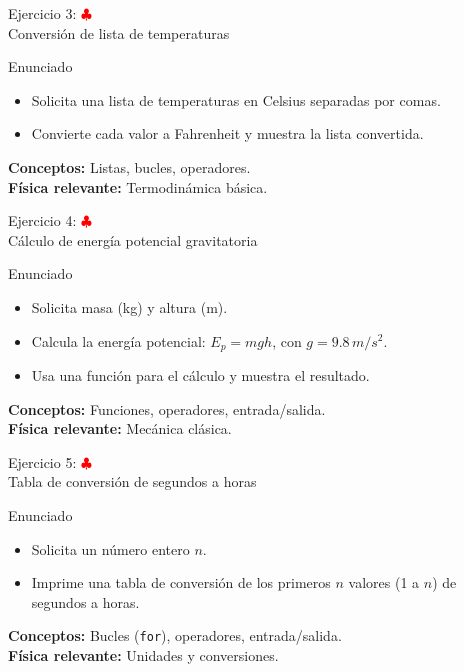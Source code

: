 \documentclass[10pt]{beamer}
\begin{document}
\begin{frame}{Ejercicio 3: \hfill \textcolor{red}{$\clubsuit$} \\ Conversión de lista de temperaturas}
  \begin{block}{Enunciado}
    \begin{itemize}
      \item Solicita una lista de temperaturas en Celsius separadas por comas.
      \item Convierte cada valor a Fahrenheit y muestra la lista convertida.
    \end{itemize}
  \end{block}
  \textbf{Conceptos:} Listas, bucles, operadores.\\
  \textbf{Física relevante:} Termodinámica básica.
\end{frame}

\begin{frame}{Ejercicio 4: \hfill \textcolor{red}{$\clubsuit$} \\ Cálculo de energía potencial gravitatoria}
  \begin{block}{Enunciado}
    \begin{itemize}
      \item Solicita masa (kg) y altura (m).
      \item Calcula la energía potencial: \(E_p = mgh\), con \(g = 9.8\,m/s^2\).
      \item Usa una función para el cálculo y muestra el resultado.
    \end{itemize}
  \end{block}
  \textbf{Conceptos:} Funciones, operadores, entrada/salida.\\
  \textbf{Física relevante:} Mecánica clásica.
\end{frame}

\begin{frame}{Ejercicio 5: \hfill \textcolor{red}{$\clubsuit$} \\ Tabla de conversión de segundos a horas}
  \begin{block}{Enunciado}
    \begin{itemize}
      \item Solicita un número entero \(n\).
      \item Imprime una tabla de conversión de los primeros \(n\) valores (1 a \(n\)) de segundos a horas.
    \end{itemize}
  \end{block}
  \textbf{Conceptos:} Bucles (\texttt{for}), operadores, entrada/salida.\\
  \textbf{Física relevante:} Unidades y conversiones.
\end{frame}
\end{document}

